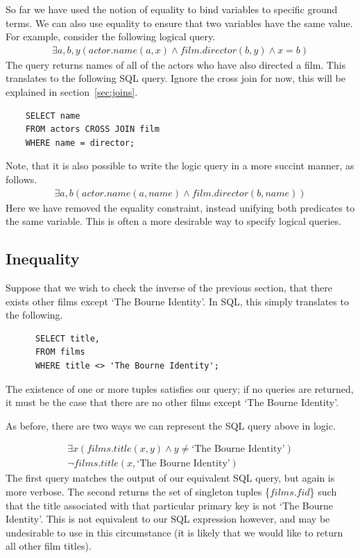 \documentclass[a4paper, 11pt]{article}
\begin{document}
    So far we have used the notion of equality to bind variables to specific
    ground terms. We can also use equality to ensure that two variables have
    the same value. For example, consider the following logical query.
    \begin{gather}
      \exists a,b,y(actor.name(a, x) \land film.director(b, y) \land x = b)
    \end{gather}
    The query returns names of all of the actors who have also directed a
    film. This translates to the following SQL query. Ignore the cross join
    for now, this will be explained in section~\ref{sec:joins}.
    \begin{verbatim}
    SELECT name
    FROM actors CROSS JOIN film
    WHERE name = director;
    \end{verbatim}
    Note, that it is also possible to write the logic query in a more succint
    manner, as follows.
    \begin{gather}
      \exists a,b(actor.name(a, name) \land film.director(b, name))
    \end{gather}
    Here we have removed the equality constraint, instead unifying both
    predicates to the same variable. This is often a more desirable way to
    specify logical queries.

  \subsection{Inequality}
    Suppose that we wish to check the inverse of the previous section, that
    there exists other films except `The Bourne Identity'. In SQL, this
    simply translates to the following.
    \begin{verbatim}
      SELECT title,
      FROM films
      WHERE title <> 'The Bourne Identity';
    \end{verbatim}
    The existence of one or more tuples satisfies our query; if no queries
    are returned, it must be the case that there are no other films except
    `The Bourne Identity'.

    As before, there are two ways we can represent the SQL query above in
    logic.

    \begin{gather}
      \exists x(films.title(x, y) \land y \neq \text{`The Bourne
      Identity'})\label{where3}\\
      \lnot films.title(x, \text{`The Bourne Identity'})\label{where4}
    \end{gather}
    The first query matches the output of our equivalent SQL query, but again
    is more verbose. The second returns the set of singleton tuples
    \{$films.fid$\} such that the title associated with that particular
    primary key is not `The Bourne Identity'. This is not equivalent to our
    SQL expression however, and may be undesirable to use in this
    circumstance (it is likely that we would like to return all other film
    titles).
\end{document}
